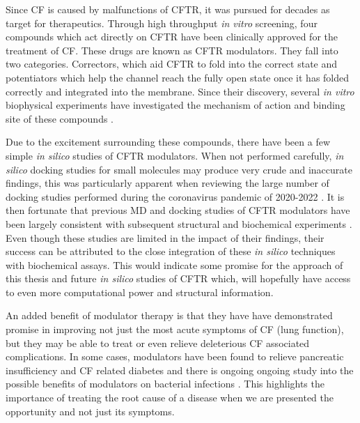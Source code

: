 Since CF is caused by malfunctions of CFTR, it was pursued for decades as target for therapeutics. Through high throughput \textit{in vitro} screening, four compounds which act directly on CFTR have been clinically approved for the treatment of CF. These drugs are known as CFTR modulators. They fall into two categories. Correctors, which aid CFTR to fold into the correct state and potentiators which help the channel reach the fully open state once it has folded correctly and integrated into the membrane. Since their discovery, several \textit {in vitro} biophysical experiments have investigated the mechanism of action and binding site of these compounds \cite{csanady2019,  laselva2022, yeh2017, yeh2019, fiedorczuk2022, krainer2018}. 

Due to the excitement surrounding these compounds, there have been a few simple \textit{in silico} studies of CFTR modulators\cite{molinski2018, bitam2021, baatallah2021, froux2020}. When not performed carefully, \textit{in silico} docking studies for small molecules may produce very crude and inaccurate findings, this was particularly apparent when reviewing the large number of docking studies performed during the coronavirus pandemic of 2020-2022 \cite{gimeno2019, derek_lowe_virtual_screening_2022, ceron-carrasco2022}. It is then fortunate that previous MD and docking studies of CFTR modulators have been largely consistent with subsequent structural and biochemical experiments \cite{liu2019, scientifique2019, yeh2019, yeh2017, fiedorczuk2022}. Even though these studies are limited in the impact of their findings, their success can be attributed to the close integration of these \textit{in silico} techniques with biochemical assays. This would indicate some promise for the approach of this thesis and future \textit{in silico} studies of CFTR which, will hopefully have access to even more computational power and structural information. 


An added benefit of modulator therapy is that they have have demonstrated promise in improving not just the most acute symptoms of CF (lung function), but they may be able to treat or even relieve deleterious CF associated complications. In some cases, modulators have been found to relieve pancreatic insufficiency and CF related diabetes \cite{gaines2021,lopes-pacheco2020, yi2021} and there is ongoing ongoing study into the possible benefits of modulators on bacterial infections \cite{harvey2022}. This highlights the importance of treating the root cause of a disease when we are presented the opportunity and not just its symptoms. 

